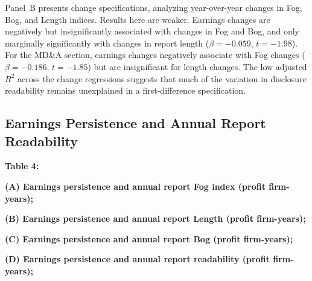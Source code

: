 \documentclass[a4paper]{article}
\begin{document}
Panel~B presents change specifications, analyzing year-over-year changes in Fog, Bog, and Length indices. Results here are weaker. Earnings changes are negatively but insignificantly associated with changes in Fog and Bog, and only marginally significantly with changes in report length ($\beta = -0.059$, $t = -1.98$). For the MD&A section, earnings changes negatively associate with Fog changes ($\beta = -0.186$, $t = -1.85$) but are insignificant for length changes. The low adjusted \( R^2 \) across the change regressions suggests that much of the variation in disclosure readability remains unexplained in a first-difference specification.


\subsection{Earnings Persistence and Annual Report Readability}


{\normalsize \textbf{Table 4: } \par}
{\normalsize \textbf{(A) Earnings persistence and annual report Fog index (profit firm-years);} \par}
{\normalsize \textbf{(B) Earnings persistence and annual report Length (profit firm-years);} \par}
{\normalsize \textbf{(C) Earnings persistence and annual report Bog (profit firm-years);} \par}
{\normalsize \textbf{(D) Earnings persistence and annual report readability (profit firm-years);} \par}
\end{document}
